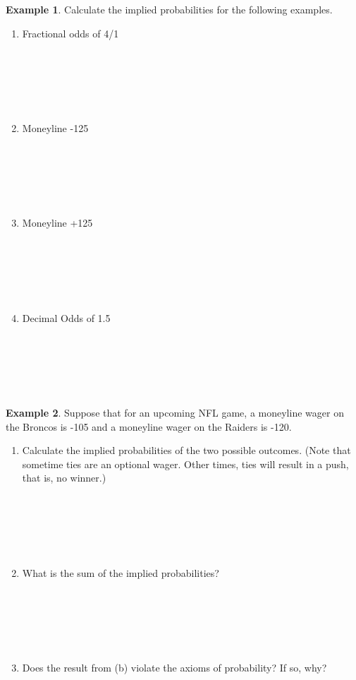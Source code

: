 \documentclass[
  11pt,
]{book}
\theoremstyle{definition}
\theoremstyle{definition}
\newtheorem{example}{Example}[chapter]
\theoremstyle{definition}
\theoremstyle{definition}
\theoremstyle{remark}
\begin{document}
\begin{example}
Calculate the implied probabilities for the following examples.
\end{example}

\begin{enumerate}
\def\labelenumi{(\alph{enumi})}
\item
  Fractional odds of 4/1\\
  \strut \\
  \strut \\
  \strut \\
  \vfill
\item
  Moneyline -125\\
  \strut \\
  \strut \\
  \strut \\
  \vfill
\item
  Moneyline +125\\
  \strut \\
  \strut \\
  \strut \\
  \vfill
\item
  Decimal Odds of 1.5\\
  \strut \\
  \strut \\
  \strut \\
  \vfill
\end{enumerate}

\newpage

\begin{example}
Suppose that for an upcoming NFL game, a moneyline wager on the Broncos is -105 and a moneyline wager on the Raiders is -120.
\end{example}

\begin{enumerate}
\def\labelenumi{(\alph{enumi})}
\item
  Calculate the implied probabilities of the two possible outcomes. (Note that sometime ties are an optional wager. Other times, ties will result in a push, that is, no winner.)\\
  \strut \\
  \strut \\
  \strut \\
  \vfill
\item
  What is the sum of the implied probabilities?\\
  \strut \\
  \strut \\
  \strut \\
  \vfill
\item
  Does the result from (b) violate the axioms of probability? If so, why?\\
  \strut \\
  \strut \\
  \strut \\
  \vfill
\end{enumerate}
\end{document}
